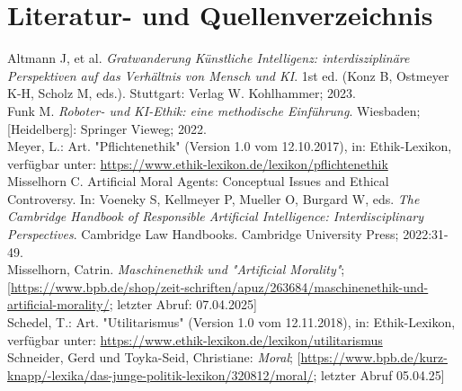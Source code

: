 \section{Literatur- und Quellenverzeichnis}\label{sec::literaturverzeichnis}

Altmann J, et al.
\textit{Gratwanderung Künstliche Intelligenz: interdisziplinäre Perspektiven auf das Verhältnis von Mensch und KI}.
1st ed.
(Konz B, Ostmeyer K-H, Scholz M, eds.). Stuttgart: Verlag W. Kohlhammer; 2023. \\
\newline
Funk M.
\textit{Roboter- und KI-Ethik: eine methodische Einführung}.
Wiesbaden; [Heidelberg]: Springer Vieweg; 2022. \\
\newline
Meyer, L.: Art.
"Pflichtenethik" (Version 1.0 vom 12.10.2017), in: Ethik-Lexikon, verfügbar unter:
\href{https://www.ethik-lexikon.de/lexikon/pflichtenethik}{https://www.ethik-lexikon.de/lexikon/pflichtenethik} \\
\newline
Misselhorn C. Artificial Moral Agents:
Conceptual Issues and Ethical Controversy.
In: Voeneky S, Kellmeyer P, Mueller O, Burgard W, eds.
\textit{The Cambridge Handbook of Responsible Artificial Intelligence: Interdisciplinary Perspectives}.
Cambridge Law Handbooks.
Cambridge University Press; 2022:31-49. \\
\newline
Misselhorn, Catrin.
\textit{Maschinenethik und "Artificial Morality"};
[\href{https://www.bpb.de/shop/zeitschriften/apuz/263684/maschinenethik-und-artificial-morality/}{https://www.bpb.de/shop/zeit-schriften/apuz/263684/maschinenethik-und-artificial-morality/};
letzter Abruf: 07.04.2025] \\
\newline
Schedel, T.: Art.
"Utilitarismus" (Version 1.0 vom 12.11.2018), in: Ethik-Lexikon, verfügbar
unter: \href{https://www.ethik-lexikon.de/lexikon/utilitarismus}{https://www.ethik-lexikon.de/lexikon/utilitarismus} \\
\newline
Schneider, Gerd und Toyka-Seid, Christiane:
\textit{Moral};
[\href{https://www.bpb.de/kurz-knapp/lexika/das-junge-politik-lexikon/320812/moral/}{https://www.bpb.de/kurz-knapp/-lexika/das-junge-politik-lexikon/320812/moral/};
letzter Abruf 05.04.25] \\






